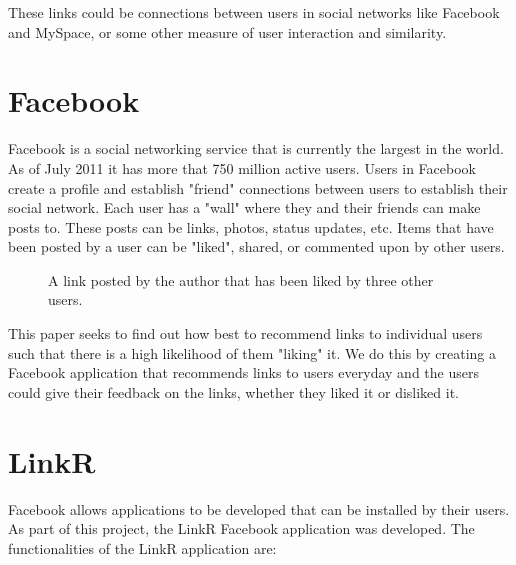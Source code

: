These links could be connections between users in social networks like Facebook and MySpace, or some other measure of user interaction and similarity.

\section{Facebook}

Facebook is a social networking service that is currently the largest in the world. As of July 2011 it has more that 750 million active users. Users in Facebook create a profile and establish "friend" connections between users to establish their social network. Each user has a "wall" where they and their friends can make posts to. These posts can be links, photos, status updates, etc. Items that have been posted by a user can be "liked", shared, or commented upon by other users. 

\begin{figure}[h]
\centering
{}
\caption{A link posted by the author that has been liked by three other users.}
\end{figure}

This paper seeks to find out how best to recommend links to individual users such that there is a high likelihood of them "liking" it. We do this by creating a Facebook application that recommends links to users everyday and the users could give their feedback on the links, whether they liked it or disliked it. 

\section{LinkR}
Facebook allows applications to be developed that can be installed by their users. As part of this project, the LinkR Facebook application was developed. The functionalities of the LinkR application are:

